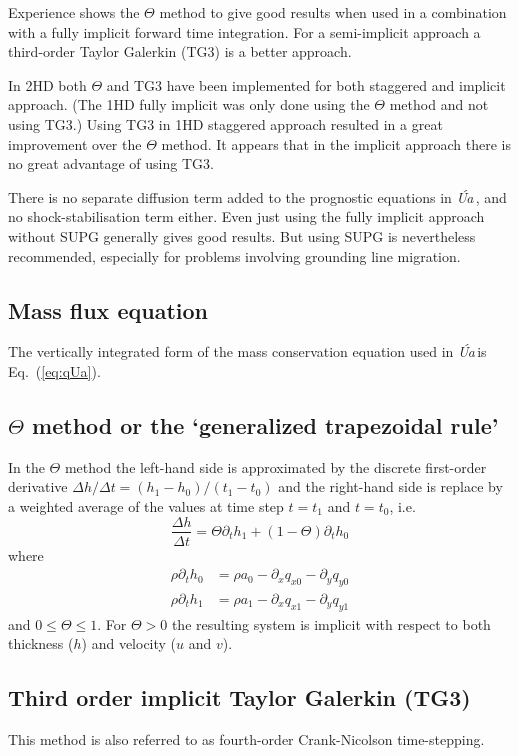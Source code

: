 \documentclass[10pt,a4paper]{book}
\newcommand{\p}{\partial}
\newcommand{\Ua}{\textsl{\'Ua}\,}
\begin{document}
Experience shows the $\Theta$ method to give good results when used in
a combination with a fully implicit forward time integration. For a
semi-implicit approach a third-order Taylor Galerkin (TG3) is a better approach.




In 2HD both $\Theta$ and TG3 have been implemented for both staggered
and implicit approach. (The 1HD fully implicit was only done using the
$\Theta$ method and not using TG3.) Using TG3 in 1HD staggered
approach resulted in a great improvement over the $\Theta$ method.  It
appears that in the implicit approach there is no great advantage of
using TG3.

There is no separate diffusion term added to the prognostic equations
in \Ua, and no shock-stabilisation term either.  Even just using the
fully implicit approach without SUPG generally gives good results. But
using SUPG is nevertheless recommended, especially for problems
involving grounding line migration.

\subsection{Mass flux equation}

The vertically integrated form of the mass conservation equation
used in \Ua is Eq.~(\ref{eq:qUa}). 


\subsection{$\Theta$ method or the `generalized trapezoidal rule'}

In the $\Theta$ method the left-hand side is approximated by the 
discrete first-order derivative $\Delta h/\Delta t=(h_1-h_0)/(t_1-t_0)$
and the right-hand side is replace by a weighted average of the values at time step $t=t_1$ and $t=t_0$, i.e.\
\[ \frac{\Delta h}{\Delta t}= \Theta \p_t h_1 +(1-\Theta) \p_t h_0  \]
where
\begin{align*}
\rho \p_t h_0&=\rho a_0-\p_x q_{x0} - \p_y q_{y0}\\
\rho \p_t h_1&=\rho a_1-\p_x q_{x1} - \p_y q_{y1}
\end{align*}
and $0 \le \Theta \le 1$. For $\Theta>0$ the resulting system is
implicit with respect to both thickness ($h$) and velocity ($u$ and
$v$).


\subsection{Third order implicit Taylor Galerkin (TG3)}
This method is also referred to as fourth-order Crank-Nicolson time-stepping.
\end{document}
